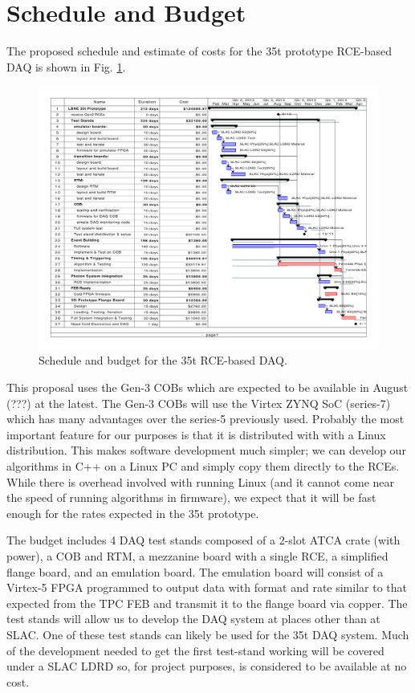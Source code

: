 \section{Schedule and Budget}

The proposed schedule and estimate of costs for the 35t prototype RCE-based DAQ is shown in Fig. \ref{fig:budget35t}.  

\begin{figure}[htb]
\includegraphics[scale=0.8,angle=90]{project-gantt.pdf}
\caption{Schedule and budget for the 35t RCE-based DAQ.}
\label{fig:budget35t}
\end{figure} 

This proposal uses the Gen-3 COBs which are expected to be available in August  (???) at the latest.  The Gen-3 COBs will use the Virtex ZYNQ SoC (series-7) which has many advantages over the series-5 previously used.  Probably the most important feature for our purposes is that it is distributed with with a Linux distribution.  This makes software development much simpler; we can develop our algorithms in C++ on a Linux PC and simply copy them directly to the RCEs.  While there is overhead involved with running Linux (and it cannot come near the speed of running algorithms in firmware), we expect that it will be fast enough for the rates expected in the 35t prototype.  

The budget includes 4 DAQ test stands composed of a 2-slot ATCA crate (with power), a COB and RTM, a mezzanine board with a single RCE, a simplified flange board, and an emulation board.  The emulation board will consist of a Virtex-5 FPGA programmed to output data with format and rate  similar to that expected from the TPC FEB and transmit it to the flange board via copper.  The test stands will allow us to develop the DAQ system at places other than at SLAC.  One of these test stands can likely be used for the 35t DAQ system.    Much of the development needed to get the first test-stand working will be covered under a SLAC LDRD so, for project purposes, is considered to be available at no cost.  


